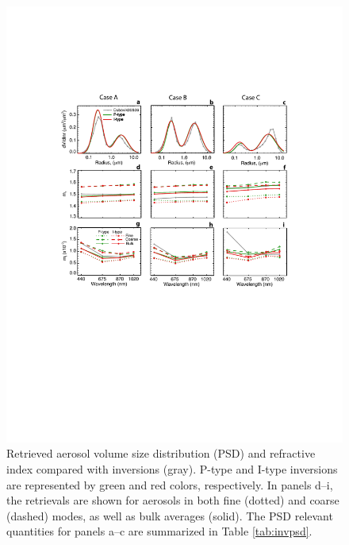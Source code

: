 \begin{figure}[t]
  \centering
  \includegraphics[width={\textwidth}]{figures/inv03.pdf}
  \caption[Retrieved aerosol volume size distribution and refractive
index compared with \Dub inversions.]
  {Retrieved aerosol volume size distribution (PSD) and refractive
index compared with \Dub inversions (gray). P-type and I-type
inversions are represented by green and red colors, respectively. In panels
d--i, the retrievals are shown for aerosols in both fine (dotted) and coarse
(dashed) modes, as well as bulk averages (solid). The PSD relevant quantities
for panels a--c are summarized in Table \ref{tab:invpsd}.}
  \label{fig:inv01}
\end{figure}

